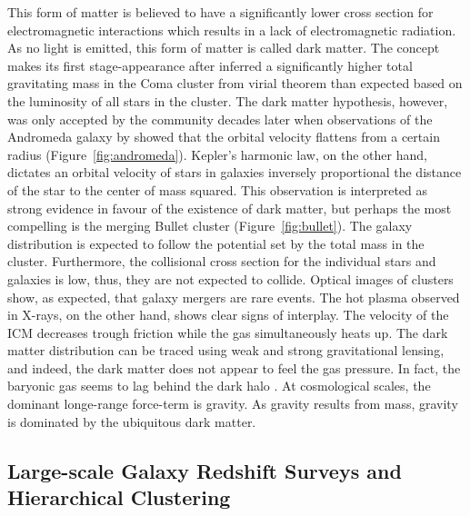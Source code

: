 \documentclass[MScProj_TLRH_ClusterEnergy.tex]{subfiles}
\begin{document}
\noindent This form of matter is believed
to have a significantly lower cross section for electromagnetic interactions 
which results in a lack of electromagnetic radiation. As no light is emitted,
this form of matter is called dark matter. The concept makes its first 
stage-appearance after \citet{1933AcHPh...6..110Z} inferred a significantly 
higher total gravitating mass in the Coma cluster from virial theorem than 
expected based on the luminosity of all stars in the cluster. The dark matter
hypothesis, however, was only accepted by the community decades later when 
observations of the Andromeda galaxy by \citet{1970ApJ...159..379R} showed that
the orbital velocity flattens from a certain radius (Figure~\ref{fig:andromeda}).
Kepler's harmonic law, on the other hand, dictates an orbital velocity of stars
in galaxies inversely proportional the distance of the star to the center of
mass squared. This observation is interpreted as strong evidence in favour of
the existence of dark matter, but perhaps the most compelling is the merging
Bullet cluster (Figure~\ref{fig:bullet}). The galaxy distribution is expected
to follow the potential set by the total mass in the cluster. Furthermore, the
collisional cross section for the individual stars and galaxies is low, thus,
they are not expected to collide. Optical images of clusters show, as expected,
that galaxy mergers are rare events. The hot plasma observed in X-rays, on the
other hand, shows clear signs of interplay. The velocity of the ICM decreases
trough friction while the gas simultaneously heats up. The dark matter 
distribution can be traced using weak and strong gravitational lensing, and 
indeed, the dark matter does not appear to feel the gas pressure. In fact, the
baryonic gas seems to lag behind the dark halo \citep{2004ApJ...606..819M}.
At cosmological scales, the dominant longe-range force-term is gravity. As 
gravity results from mass, gravity is dominated by the ubiquitous dark matter.


\subsection*{Large-scale Galaxy Redshift Surveys and Hierarchical Clustering}
\label{sec:hierarchicalclustering}
\end{document}
